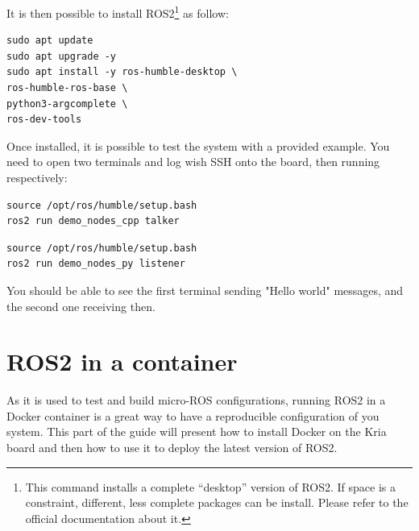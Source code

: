 \documentclass[10pt]{article}
\begin{document}
It is then possible to install ROS2\footnote{This command installs a complete ``desktop'' version of ROS2. If space is a constraint, different, less complete packages can be install. Please refer to the official documentation about it.} as follow:

\begin{tcolorbox}
\begin{verbatim}
sudo apt update
sudo apt upgrade -y
sudo apt install -y ros-humble-desktop \
ros-humble-ros-base \
python3-argcomplete \
ros-dev-tools
\end{verbatim}
\end{tcolorbox}

Once installed, it is possible to test the system with a provided example. You need to open two terminals and log wish SSH onto the board, then running respectively:

\begin{tcolorbox}
\begin{verbatim}
source /opt/ros/humble/setup.bash
ros2 run demo_nodes_cpp talker
\end{verbatim}
\end{tcolorbox}



\begin{tcolorbox}
\begin{verbatim}
source /opt/ros/humble/setup.bash
ros2 run demo_nodes_py listener
\end{verbatim}
\end{tcolorbox}


You should be able to see the first terminal sending "Hello world" messages, and the second one receiving then.


\section{ROS2 in a container}
\label{sec:ros2-container}
As it is used to test and build micro-ROS configurations, running ROS2 in a Docker container is a great way to have a reproducible configuration
of you system. This part of the guide will present how to install Docker on the Kria board and then how to use it to deploy the latest
version of ROS2.
\end{document}
